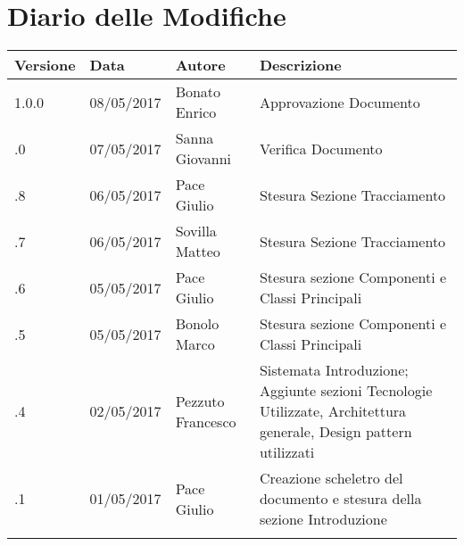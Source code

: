 \section*{Diario delle Modifiche}
\begin{longtabu} to \textwidth {
	X[4,l,p]
	X[4,l,p]
	X[4,l,p]
	X[8,l,p]}
	\toprule
		 Versione & Data & Autore & Descrizione \\
		\midrule
		\endhead
		1.0.0 & 08/05/2017 & Bonato Enrico & Approvazione Documento\\
		\addlinespace[0.2em]
		\midrule
		.0 & 07/05/2017 & Sanna Giovanni & Verifica Documento\\
		\addlinespace[0.2em]
		\midrule
		.8 & 06/05/2017 & Pace Giulio & Stesura Sezione Tracciamento\\
		\addlinespace[0.2em]
		\midrule
		.7 & 06/05/2017 & Sovilla Matteo & Stesura Sezione Tracciamento\\
		\addlinespace[0.2em]
		\midrule
		.6 & 05/05/2017 & Pace Giulio & Stesura sezione Componenti e Classi Principali\\
		\addlinespace[0.2em]
		\midrule
		.5 & 05/05/2017 & Bonolo Marco & Stesura sezione Componenti e Classi Principali\\
		\addlinespace[0.2em]
		\midrule
		.4 & 02/05/2017 & Pezzuto Francesco & Sistemata Introduzione; Aggiunte sezioni Tecnologie Utilizzate, Architettura generale, Design pattern utilizzati\\
		\addlinespace[0.2em]
		\midrule
		.1 & 01/05/2017 & Pace Giulio & Creazione scheletro del documento e stesura della sezione Introduzione\\
		\addlinespace[0.4em]
		
	\bottomrule
\end{longtabu}
